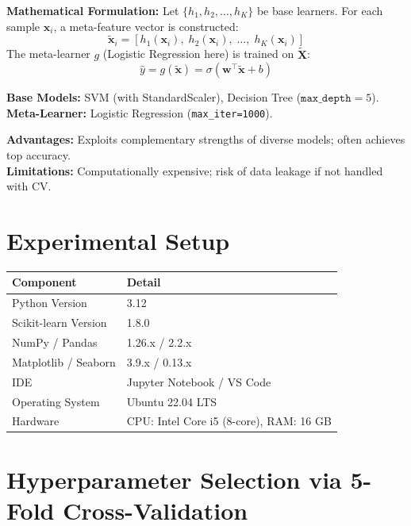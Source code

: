 \documentclass[12pt,a4paper]{article}
\begin{document}
\textbf{Mathematical Formulation:}
Let $\{h_1, h_2, \ldots, h_K\}$ be base learners. For each sample $\mathbf{x}_i$, a meta-feature
vector is constructed:
\[
\tilde{\mathbf{x}}_i = [h_1(\mathbf{x}_i),\; h_2(\mathbf{x}_i),\; \ldots,\; h_K(\mathbf{x}_i)]
\]
The meta-learner $g$ (Logistic Regression here) is trained on $\tilde{\mathbf{X}}$:
\[
\hat{y} = g(\tilde{\mathbf{x}}) = \sigma\!\left(\mathbf{w}^\top \tilde{\mathbf{x}} + b\right)
\]

\textbf{Base Models:} SVM (with StandardScaler), Decision Tree ($\texttt{max\_depth}=5$).\\
\textbf{Meta-Learner:} Logistic Regression (\texttt{max\_iter=1000}).

\textbf{Advantages:} Exploits complementary strengths of diverse models; often achieves top accuracy.\\
\textbf{Limitations:} Computationally expensive; risk of data leakage if not handled with CV.

\section{Experimental Setup}

\begin{tabular}{ll}
\toprule
\textbf{Component}        & \textbf{Detail} \\
\midrule
Python Version            & 3.12 \\
Scikit-learn Version      & 1.8.0 \\
NumPy / Pandas            & 1.26.x / 2.2.x \\
Matplotlib / Seaborn      & 3.9.x / 0.13.x \\
IDE                       & Jupyter Notebook / VS Code \\
Operating System          & Ubuntu 22.04 LTS \\
Hardware                  & CPU: Intel Core i5 (8-core), RAM: 16 GB \\
\bottomrule
\end{tabular}

\section{Hyperparameter Selection via 5-Fold Cross-Validation}
\end{document}
